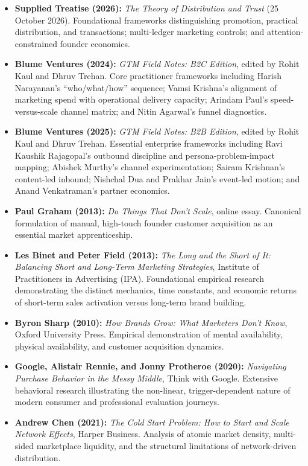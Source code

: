\begin{itemize}[leftmargin=*,itemsep=1pt]
  \item \textbf{Supplied Treatise (2026):} \textit{The Theory of Distribution and Trust} (25 October 2026). Foundational frameworks distinguishing promotion, practical distribution, and transactions; multi-ledger marketing controls; and attention-constrained founder economics.
  \item \textbf{Blume Ventures (2024):} \textit{GTM Field Notes: B2C Edition}, edited by Rohit Kaul and Dhruv Trehan. Core practitioner frameworks including Harish Narayanan's ``who/what/how'' sequence; Vamsi Krishna's alignment of marketing spend with operational delivery capacity; Arindam Paul's speed-versus-scale channel matrix; and Nitin Agarwal's funnel diagnostics.
  \item \textbf{Blume Ventures (2025):} \textit{GTM Field Notes: B2B Edition}, edited by Rohit Kaul and Dhruv Trehan. Essential enterprise frameworks including Ravi Kaushik Rajagopal's outbound discipline and persona-problem-impact mapping; Abishek Murthy's channel experimentation; Sairam Krishnan's content-led inbound; Nishchal Dua and Prakhar Jain's event-led motion; and Anand Venkatraman's partner economics.
  \item \textbf{Paul Graham (2013):} \textit{Do Things That Don't Scale}, online essay. Canonical formulation of manual, high-touch founder customer acquisition as an essential market apprenticeship.
  \item \textbf{Les Binet and Peter Field (2013):} \textit{The Long and the Short of It: Balancing Short and Long-Term Marketing Strategies}, Institute of Practitioners in Advertising (IPA). Foundational empirical research demonstrating the distinct mechanics, time constants, and economic returns of short-term sales activation versus long-term brand building.
  \item \textbf{Byron Sharp (2010):} \textit{How Brands Grow: What Marketers Don't Know}, Oxford University Press. Empirical demonstration of mental availability, physical availability, and customer acquisition dynamics.
  \item \textbf{Google, Alistair Rennie, and Jonny Protheroe (2020):} \textit{Navigating Purchase Behavior in the Messy Middle}, Think with Google. Extensive behavioral research illustrating the non-linear, trigger-dependent nature of modern consumer and professional evaluation journeys.
  \item \textbf{Andrew Chen (2021):} \textit{The Cold Start Problem: How to Start and Scale Network Effects}, Harper Business. Analysis of atomic market density, multi-sided marketplace liquidity, and the structural limitations of network-driven distribution.
\end{itemize}
